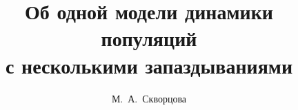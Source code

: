 


\usepackage[russian]{nla}

%
%


%




%
\fi
\title{Об одной модели динамики популяций \\
с несколькими запаздываниями}
\author{М.~А.~Скворцова%
} %


\maketitle

